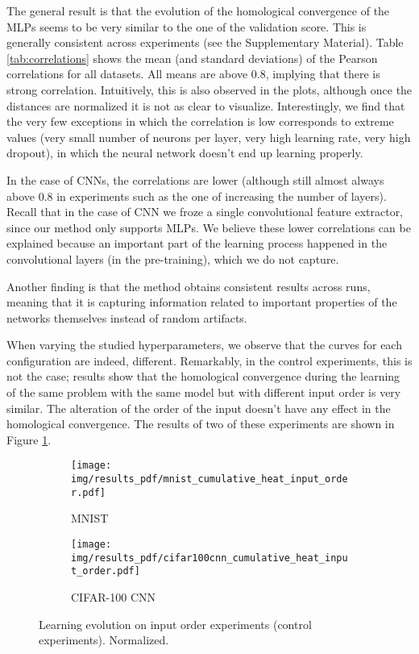 \documentclass{article}
\begin{document}
The general result is that the evolution of the homological convergence of the MLPs seems to be very similar to the one of the validation score. This is generally consistent across experiments (see the Supplementary Material). Table \ref{tab:correlations} shows the mean (and standard deviations) of the Pearson correlations for all datasets. All means are above 0.8, implying that there is strong correlation. Intuitively, this is also observed in the plots, although once the distances are normalized it is not as clear to visualize.  Interestingly, we find that the very few exceptions in which the correlation is low corresponds to extreme values (very small number of neurons per layer, very high learning rate, very high dropout), in which the neural network doesn't end up learning properly. 

In the case of CNNs, the correlations are lower (although still almost always above 0.8 in experiments such as the one of increasing the number of layers). Recall that in the case of CNN we froze a single convolutional feature extractor, since our method only supports MLPs. We believe these lower correlations can be explained because an important part of the learning process happened in the convolutional layers (in the pre-training), which we do not capture.

Another finding is that the method obtains consistent results across runs, meaning that it is capturing information related to important properties of the networks themselves instead of random artifacts.

When varying the studied hyperparameters, we observe that the curves for each configuration are indeed, different. Remarkably, in the control experiments, this is not the case; results show that the homological convergence during the learning of the same problem with the same model but with different input order is very similar. The alteration of the order of the input doesn't have any effect in the homological convergence. The results of two of these experiments are shown in Figure \ref{fig:result_control_experiment}.


\begin{figure}[h]
\centering
\begin{subfigure}{.48\textwidth}
  \centering
  \texttt{[image: img/results\_pdf/mnist\_cumulative\_heat\_input\_order.pdf]}
  \caption{MNIST}
\end{subfigure}
\begin{subfigure}{.48\textwidth}
  \centering
  \texttt{[image: img/results\_pdf/cifar100cnn\_cumulative\_heat\_input\_order.pdf]}
  \caption{CIFAR-100 CNN}
\end{subfigure}
\caption{Learning evolution on input order experiments (control experiments). Normalized.}
\label{fig:result_control_experiment}
\end{figure}
\end{document}
